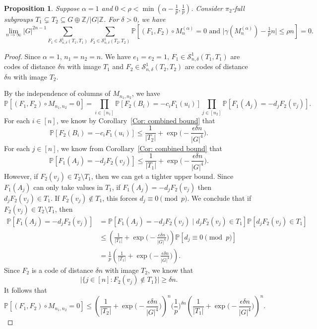 \documentclass[12pt]{amsart}
\newtheorem{proposition}[theorem]{Proposition}
\theoremstyle{definition}
\newcommand{\PPP}{\mathbb{P}}
\newcommand{\SSO}[3]{\mathcal{S}^1_{#1}(#2,#3)}
\newcommand{\Mnot}{M_{n_1,n_2}}
\newcommand{\Mna}{M_{n}^{(\alpha)}}
\newcommand{\ZG}{\Z/\abs{G}\Z}
\newcommand{\abs}[1]{\vert#1\vert}
\newcommand{\Z}{\mathbb{Z}}
\begin{document}
\begin{proposition}\label{Prop: Laplacian error term alpha 1}
Suppose $\alpha= 1$ and $0<\rho< \min(\alpha-\frac{1}{p},\frac{1}{p})$.
Consider $\pi_2$-full subgroups $T_1 \subsetneq T_2 \subseteq G\oplus\ZG$.
For $\delta>0$, we have
\[
\lim_{n\to\infty}
\abs{G}^{2n-1}
\sum_{F_1\in \SSO{n,\delta}{T_1}{T_1}}
\sum_{F_2\in \SSO{n,\delta}{T_2}{T_2}}
\PPP[(F_1,F_2)\circ \Mna=0 \text{ and } \abs{\gamma(\Mna)-\tfrac{1}{p}n} \leq \rho n]
=0.
\]
\end{proposition}
\begin{proof}
Since $\alpha=1$, $n_1=n_2=n$.
We have $e_1=e_2=1$, $F_1\in \SSO{n,\delta}{T_1}{T_1}$ are codes of distance $\delta n$ with image $T_1$ and $F_2\in \SSO{n,\delta}{T_2}{T_2}$ are codes of distance $\delta n$ with image $T_2$.

By the independence of columns of $\Mnot$, we have
\[
\PPP[(F_1,F_2)\circ \Mnot=0]
=\prod_{i\in [n_1]} \PPP[F_2(B_i)=-c_iF_1(u_i)]
\prod_{j\in [n_2]} \PPP[F_1(A_j)=-d_jF_2(v_j)].
\]
For each $i\in [n]$, we know by Corollary~\ref{Cor: combined bound} that
\[
\PPP[F_2(B_i)=-c_iF_1(u_i)]
\leq  \frac{1}{\abs{T_2}} + \exp\Big(-\frac{\epsilon \delta n}{|G|^4}\Big).
\]
For each $j\in [n]$, we know from Corollary~\ref{Cor: combined bound} that
\[
\PPP[F_1(A_j)= -d_jF_2(v_j)]
\leq \frac{1}{\abs{T_1}} + \exp\Big(-\frac{\epsilon \delta n}{|G|^4}\Big).
\]
However, if $F_2(v_j)\in T_2\setminus T_1$, then we can get a tighter upper bound. Since $F_1(A_j)$ can only take values in $T_1$, if $F_1(A_j)= -d_jF_2(v_j)$ then $d_jF_2(v_j)\in T_1$. If $F_2(v_j)\notin T_1$, this forces $d_j\equiv 0\pmod{p}$.
We conclude that if $F_2(v_j)\in T_2\setminus T_1$, then
\begin{align*}
\PPP[F_1(A_j)= -d_jF_2(v_j)]
&= \PPP[F_1(A_j)= -d_jF_2(v_j) \mid d_jF_2(v_j)\in T_1]
\PPP[d_jF_2(v_j)\in T_1]\\
&\leq \left( \frac{1}{\abs{T_1}} + \exp\Big(-\frac{\epsilon \delta n}{|G|^4}\Big)\right)
\PPP[d_j\equiv 0\pmod{p}]\\
&= \frac{1}{p}
\left( \frac{1}{\abs{T_1}} + \exp\Big(-\frac{\epsilon \delta n}{|G|^4}\Big)\right).
\end{align*}
Since $F_2$ is a code of distance $\delta n$ with image $T_2$, we know that 
\[
\abs{\{j\in [n]: F_2(v_j)\notin T_1\}}
\geq \delta n.
\]
It follows that
\[
\PPP[(F_1,F_2)\circ \Mnot=0 ]
\leq 
\left( \frac{1}{\abs{T_2}} + \exp\Big(-\frac{\epsilon \delta n}{|G|^4}\Big)\right)^{n}
\Big(\frac{1}{p}\Big)^{\delta n}
\left(\frac{1}{\abs{T_1}} + \exp\Big(-\frac{\epsilon \delta n}{|G|^4}\Big)\right)^{n}.
\]
\end{proof}
\end{document}
